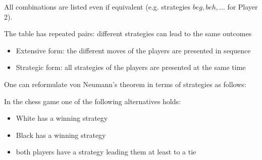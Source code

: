 \documentclass[../main.tex]{subfiles}
\begin{document}
\begin{example}
    All combinations are listed even if equivalent (e.g. strategies $beg, beh, \ldots$ for Player 2).

    The table has repeated pairs: different strategies can lead to the same outcomes
    \begin{itemize}
        \item Extensive form: the different moves of the players are presented in sequence
        \item Strategic form: all strategies of the players are presented at the same time
    \end{itemize}
\end{example}

One can reformulate von Neumann’s theorem in terms of strategies as follows:

\begin{theorem}
    In the chess game one of the following alternatives holds:
    \begin{itemize}
        \item White has a winning strategy
        \item Black has a winning strategy
        \item both players have a strategy leading them at least to a tie
    \end{itemize}
\end{theorem}
\end{document}
